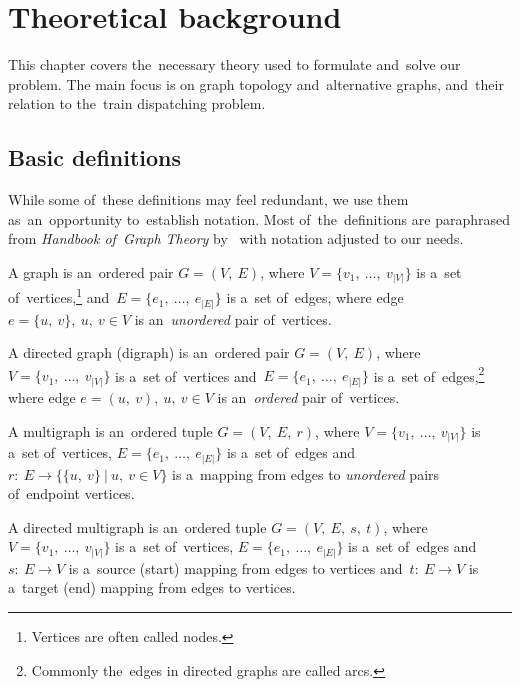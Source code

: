 \chapter{Theoretical background}
\label{chap:theor}

This chapter covers the~necessary theory used to formulate and~solve our problem. The main focus is on graph topology and~alternative graphs, and~their relation to the~train dispatching problem. 

\section{Basic definitions}
While some of~these definitions may feel redundant, we use them as~an~opportunity to~establish notation. Most of~the~definitions are paraphrased from \emph{Handbook of~Graph Theory} by~\textcite{gross2013handbook} with notation adjusted to our needs.


\begin{definition}
A graph is an~ordered pair $G = (V,\ E)$, where $V = \{v_1,\ \dots,\ v_{|V|}\}$ is a~set of~vertices,\footnote{\label{note:nodes}Vertices are often called nodes.} and~$E = \{e_1,\ \dots,\ e_{|E|}\}$ is a~set of~edges, where edge $e = \{u,\ v\},\ u,\ v \in V$ is an~\emph{unordered} pair of~vertices.
\end{definition}

\begin{definition}
\label{def:digraph}
A directed graph (digraph) is an~ordered pair $G = (V,\ E)$, where $V = \{v_1,\ \dots,\ v_{|V|}\}$ is a~set of~vertices and~$E = \{e_1,\ \dots,\ e_{|E|}\}$ is a~set of~edges,\footnote{\label{note:arcs}Commonly the~edges in directed graphs are called arcs.} where edge $e = (u,\ v),\ u,\ v \in V$ is an~\emph{ordered} pair of~vertices.
\end{definition}


\begin{definition}
A multigraph is an~ordered tuple $G = (V,\ E,\ r)$, where $V = \{v_1,\ \dots,\ v_{|V|}\}$ is a~set of~vertices, $E = \{e_1,\ \dots,\ e_{|E|}\}$ is a~set of~edges and~$r:\ E \rightarrow \{\{u,\ v\}\ |\ u,\ v \in V\}$ is a~mapping from edges to \emph{unordered} pairs of~endpoint vertices.
\end{definition}

\begin{definition}
A directed multigraph is an~ordered tuple $G = (V,\ E,\ s,\ t)$, where $V = \{v_1,\ \dots,\ v_{|V|}\}$ is a~set of~vertices, $E = \{e_1,\ \dots,\ e_{|E|}\}$ is a~set of~edges and~$s:\ E \rightarrow V$ is a~source (start) mapping from edges to vertices and~$t:\ E \rightarrow V$ is a~target (end) mapping from edges to vertices.
\end{definition}

